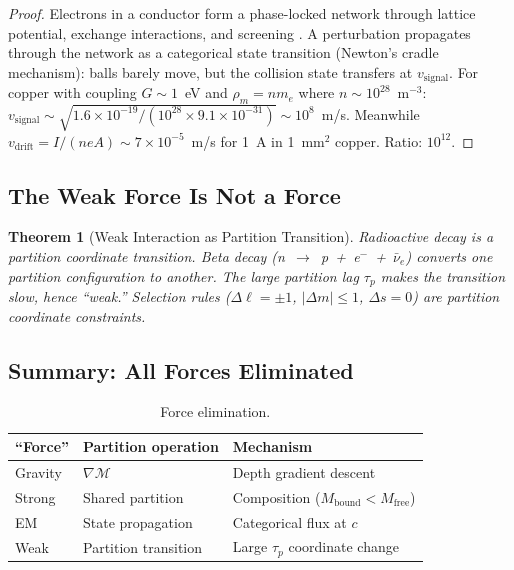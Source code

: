 \documentclass[11pt,twocolumn,a4paper]{article}
\newtheorem{theorem}{Theorem}[section]
\theoremstyle{definition}
\theoremstyle{remark}
\newcommand{\Depth}{\mathcal{M}}
\newcommand{\taup}{\tau_p}
\newcommand{\Mfree}{M_{\mathrm{free}}}
\newcommand{\Mbound}{M_{\mathrm{bound}}}
\begin{document}
\begin{proof}
Electrons in a conductor form a phase-locked network through lattice potential, exchange interactions, and screening \citep{ashcroft1976}. A perturbation propagates through the network as a categorical state transition (Newton's cradle mechanism): balls barely move, but the collision state transfers at $v_{\mathrm{signal}}$. For copper with coupling $G \sim 1$~eV and $\rho_m = nm_e$ where $n \sim 10^{28}$~m$^{-3}$: $v_{\mathrm{signal}} \sim \sqrt{1.6\times 10^{-19}/(10^{28}\times 9.1\times 10^{-31})} \sim 10^8$~m/s. Meanwhile $v_{\mathrm{drift}} = I/(neA) \sim 7\times 10^{-5}$~m/s for 1~A in 1~mm$^2$ copper. Ratio: $10^{12}$.
\end{proof}

\subsection{The Weak Force Is Not a Force}

\begin{theorem}[Weak Interaction as Partition Transition]
Radioactive decay is a partition coordinate transition. Beta decay (n~$\to$~p~+~e$^-$~+~$\bar{\nu}_e$) converts one partition configuration to another. The large partition lag $\taup$ makes the transition slow, hence ``weak.'' Selection rules ($\Delta\ell = \pm 1$, $|\Delta m| \leq 1$, $\Delta s = 0$) are partition coordinate constraints.
\end{theorem}

\subsection{Summary: All Forces Eliminated}

\begin{table}[H]
\centering
\caption{Force elimination.}
\small
\begin{tabular}{lll}
\toprule
\textbf{``Force''} & \textbf{Partition operation} & \textbf{Mechanism} \\
\midrule
Gravity & $\nabla\Depth$ & Depth gradient descent \\
Strong & Shared partition & Composition ($\Mbound < \Mfree$) \\
EM & State propagation & Categorical flux at $c$ \\
Weak & Partition transition & Large $\taup$ coordinate change \\
\bottomrule
\end{tabular}
\end{table}
\end{document}
